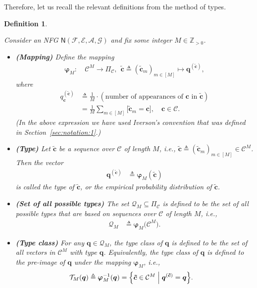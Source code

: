 \documentclass[journal, twocolumn]{IEEEtran}
\renewcommand{\mathbf}[1]{{\bm{#1}}}
\newcommand{\ie}{\emph{i.e.}}
\newcommand{\Z}{\mathbb{Z}}
\newcommand{\Zpp}{\Z_{>0}}
\newcommand{\vect}[1]{\mathbf{#1}}
\newcommand{\code}[1]{\mathcal{#1}}
\newcommand{\set}[1]{\mathcal{#1}}
\newcommand{\graph}[1]{\mathsf{#1}}
\newcommand{\defeq}{\triangleq}
\newcommand{\codeCedge}{\code{C}}
\newcommand{\setA}{\set{A}}
\newcommand{\setE}{\set{E}}
\newcommand{\setF}{\set{F}}
\newcommand{\setG}{\set{G}}
\newcommand{\vc}{\vect{c}}
\newcommand{\vq}{\vect{q}}
\newcommand{\graphN}{\graph{N}}
\newcommand{\?}{\mathrm{?}}
\newcommand{\varphiM}{\boldsymbol{\varphi}_{M}}
\newcommand{\tvc}{\vect{\tilde{c}}}
\newcommand{\vcsample}[1]{\tvc_{#1}}
\newcommand{\vcsampletot}{\tvc}
\newcommand{\vqcsample}{\vect{q}^{(\vcsampletot)}}
\newcommand{\qcsample}{q^{(\vcsampletot)}}
\newcommand{\setQsample}[1]{\set{Q}_{#1}}
\newcommand{\setPi}{\Pi}
\newtheorem{Definition}[Lemma]{Definition}
\begin{document}
Therefore, let us recall the relevant definitions from the method of types.


\begin{Definition}
  \label{def:method:of:types:1}

  Consider an NFG $\graphN(\setF,\setE, \setA, \setG)$ and fix some integer $M
  \in \Zpp$.

  \begin{itemize}

  \item \textbf{(Mapping)} Define the mapping
    \begin{align*}
      \varphiM: \
        & \codeCedge^M
          \to
          \setPi_{\codeCedge}, \ \ 
          \vcsampletot \defeq ( \vcsample{m} )_{m \in [M]}
          \mapsto 
          \vqcsample,     
    \end{align*}
    where
    \begin{align*}
      \qcsample_{\vc}
        &\defeq
           \frac{1}{M}
           \cdot
           (\text{number of appearances of $\vc$ in $\vcsampletot$}) \\
        &= \frac{1}{M}
           \sum_{m \in [M]}
             \big[ \vcsample{m} \! = \! \vc \big],
               \quad \vc \in \codeCedge.
    \end{align*}
    (In the above expression we have used Iverson's convention that was
    defined in Section~\ref{sec:notation:1}.)

  \item \textbf{(Type)} Let $\vcsampletot$ be a sequence over $\codeCedge$ of
    length $M$, \ie, $\vcsampletot \defeq ( \vcsample{m} )_{m \in [M]} \in
    \codeCedge^M$. Then the vector
    \begin{align*}
      \vqcsample
        &\defeq \varphiM(\vcsampletot)
    \end{align*}
    is called the type of $\vcsampletot$, or the empirical probability
    distribution of $\vcsampletot$.
  
  
  \item \textbf{(Set of all possible types)} The set $\setQsample{M} \subseteq
    \setPi_{\codeCedge}$ is defined to be the set of all possible types that
    are based on sequences over $\codeCedge$ of length $M$, \ie,
    \begin{align*}
      \setQsample{M}
        &\defeq
           \varphiM\big( \codeCedge^M \big).
    \end{align*}
  
  \item \textbf{(Type class)} For any $\vq \in \setQsample{M}$, the type class
    of $\vq$ is defined to be the set of all vectors in $\codeCedge^M$ with
    type $\vq$. Equivalently, the type class of $\vq$ is defined to the
    pre-image of $\vq$ under the mapping $\varphiM$, \ie,
    \begin{align*}
      \set{T}_M(\vq)
        &\defeq
           \varphiM^{-1}(\vq)
         = \Big\{
               \vcsampletot \in \codeCedge^M
             \Bigm| 
               \vqcsample = \vq
           \Big\}.
    \end{align*}


\end{itemize}
\end{Definition}
\end{document}
